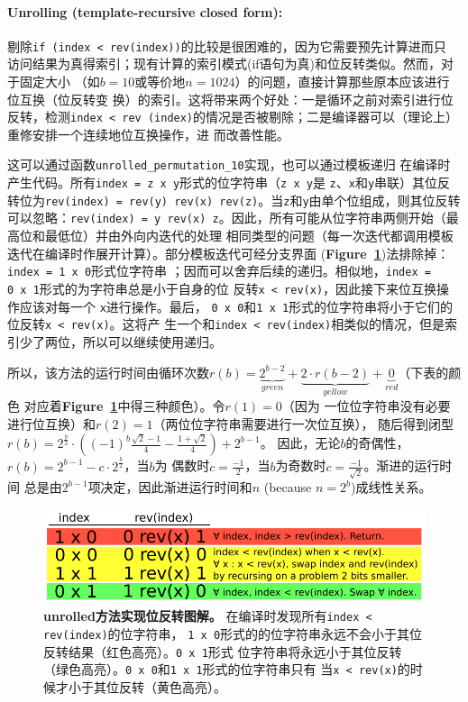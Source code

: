 \documentclass[10pt]{article}
\begin{document}
\begin{CJK*}{UTF8}{gbsn}
\paragraph{Unrolling (template-recursive closed form):}

剔除{\tt if (index < rev(index))}的比较是很困难的，因为它需要预先计算进而只
访问结果为真得索引；现有计算的索引模式(if语句为真)和位反转类似。然而，对于固定大小
（如$b = 10$或等价地$n = 1024$）的问题，直接计算那些原本应该进行位互换（位反转变
换）的索引。这将带来两个好处：一是循环之前对索引进行位反转，检测{\tt index < rev
(index)}的情况是否被剔除；二是编译器可以（理论上）重修安排一个连续地位互换操作，进
而改善性能。

这可以通过函数{\tt unrolled\_permutation\_10}实现，也可以通过模板递归
在编译时产生代码。所有{\tt index = z x y}形式的位字符串（{\tt z x y}是
 {\tt z}、{\tt x}和{\tt y}串联）其位反转位为{\tt rev(index) = rev(y) rev(x)
  rev(z)}。当{\tt z}和{\tt y}由单个位组成，则其位反转可以忽略：{\tt rev(index) = y
  rev(x) z}。因此，所有可能从位字符串两侧开始（最高位和最低位）并由外向内迭代的处理
相同类型的问题（每一次迭代都调用模板迭代在编译时作展开计算）。部分模板迭代可经分支界面
({\bf Figure~\ref{figure:unrolled}})法排除掉：{\tt index = 1~x~0}形式位字符串
；因而可以舍弃后续的递归。相似地，{\tt index = 0~x~1}形式的为字符串总是小于自身的位
反转{\tt x < rev(x)}，因此接下来位互换操作应该对每一个 {\tt x}进行操作。最后，
{\tt 0~x~0}和{\tt 1~x~1}形式的位字符串将小于它们的位反转{\tt x < rev(x)}。这将产
生一个和{\tt index < rev(index)}相类似的情况，但是索引少了两位，所以可以继续使用递归。

所以，该方法的运行时间由循环次数$r(b) = \underbrace{2^{b-2}}_{green} + 
\underbrace{2 \cdot r(b-2)}_{yellow} + \underbrace{0}_{red}$（下表的颜色
对应着{\bf Figure~\ref{figure:unrolled}}中得三种颜色）。令$r(1) = 0$（因为
一位位字符串没有必要进行位互换）和$r(2) = 1$（两位位字符串需要进行一次位互换），
随后得到闭型$r(b) =
2^{\frac{b}{2}} \cdot \left( {(-1)}^b \frac{\sqrt{2}-1}{4} - \frac{1 +
  \sqrt{2}}{4} \right) + 2^{b-1}$。
因此，无论$b$的奇偶性，$r(b) = 2^{b-1} - c \cdot 2^{\frac{b}{2}}$，当$b$为
偶数时$c=\frac{-1}{2}$，当$b$为奇数时$c=\frac{-1}{\sqrt{2}}$。渐进的运行时间
总是由$2^{b-1}$项决定，因此渐进运行时间和$n$ (because $n = 2^b$)成线性关系。

\begin{figure}
\centering
\includegraphics[width=4.5in]{cartoons/unrolled.pdf}
\caption{{\bf unrolled方法实现位反转图解。}
  在编译时发现所有{\tt index < rev(index)}的位字符串，
  {\tt 1~x~0}形式的的位字符串永远不会小于其位反转结果（红色高亮）。{\tt 0~x~1}形式
  位字符串将永远小于其位反转（绿色高亮）。{\tt 0~x~0}和{\tt 1~x~1}形式的位字符串只有
  当{\tt x < rev(x)}的时候才小于其位反转（黄色高亮）。
  \label{figure:unrolled}}
\end{figure}


\end{CJK*}
\end{document}
